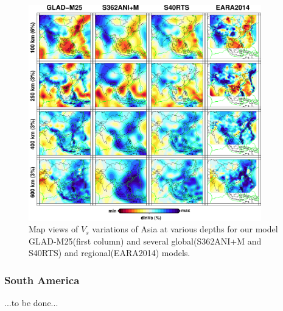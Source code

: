 \documentclass[extra,mreferee]{gji}
\begin{document}
\begin{figure}
\includegraphics[width=0.9\textwidth]{figures/depth_slice/asia_vs.pdf}
  \caption{Map views of $V_s$ variations of Asia at various depths for our model GLAD-M25(first column) and several global(S362ANI+M and S40RTS) and regional(EARA2014\citep{chen2015multiparameter}) models.}
\label{fig:asia-vs}
\centering
\end{figure}

\subsubsection{South America}
...to be done...
\end{document}
